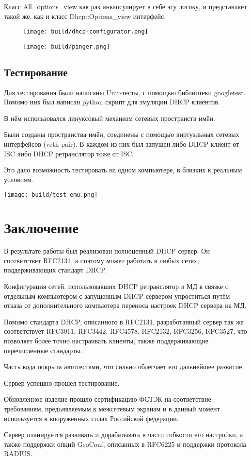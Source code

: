 \documentclass[12pt]{article}
\begin{document}
Класс All\_options\_view как раз инкапсулирует в себе эту логику, и представляет такой же, как и класс Dhcp::Options\_view интерфейс.


\begin{figure}[H]
    \texttt{[image: build/dhcp-configurator.png]}
    \caption{}
\end{figure}

\begin{figure}[H]
    \texttt{[image: build/pinger.png]}
    \caption{}
\end{figure}

\pagebreak
\subsection{Тестирование}

Для тестирования были написаны Unit-тесты, с помощью библиотеки googletest.
Помимо них был написан python скрипт для эмуляции DHCP клиентов.

В нём использовался линуксовый механизм сетевых пространств имён.

Были созданы пространства имён, соединены с помощью виртуальных сетевых интерфейсов (veth pair). В каждом из них был запущен либо DHCP клиент от ISC либо DHCP ретранслятор тоже от ISC.

Это дало возможность тестировать на одном компьютере, в близких к реальным условиям.

\texttt{[image: build/test-emu.png]}

\pagebreak
\section{Заключение}

В результате работы был реализован полноценный DHCP сервер.
Он соответствет RFC2131, а поэтому может работать в любых сетях, поддерживающих стандарт DHCP.

Конфигурация сетей, использовавших DHCP ретранслятор в МД в связке с отдельным компьютером с запущенным DHCP сервером упроститься путём отказа от дополнительного компьютера переноса настроек DHCP сервера на МД.

Помимо стандарта DHCP, описанного в RFC2131, разработанный сервер так же соответствует RFC3011, RFC3442, RFC4578, RFC2132, RFC3256, RFC3527, что позволяет более точно настраивать клиенты, также поддерживающие перечисленные стандарты.

Часть кода покрыта автотестами, что сильно облегчает его дальнейшее развитие.

Сервер успешно прошел тестирование.

Обновлённое изделие прошло сертификацию ФСТЭК на соответствие требованиям, предъявляемым к межсетевым экранам и в данный момент используется в вооруженных силах Российской федерации.

Сервер планируется развивать и дорабатывать в части гибкости его настройки, а также поддержки опций GeoConf, описанных в RFC6225 и поддержки протокола RADIUS.
\end{document}
